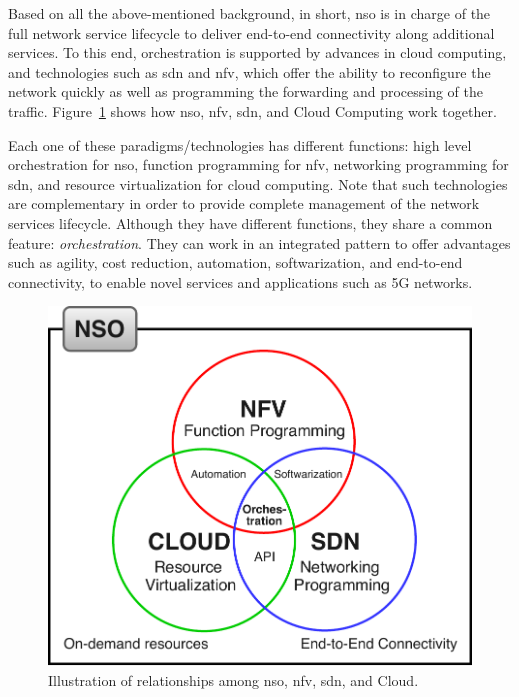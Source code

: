 Based on all the above-mentioned background, in short, \gls{nso} is in charge of the full network service lifecycle to deliver end-to-end connectivity along additional services. To this end, orchestration is supported by advances in cloud computing, and technologies such as \gls{sdn} and \gls{nfv}, which offer the ability to reconfigure the network quickly as well as programming the forwarding and processing of the traffic. Figure~\ref{nso_rel} shows how \gls{nso}, \gls{nfv}, \gls{sdn}, and Cloud Computing work together. %

Each one of these paradigms/technologies has different functions: high level orchestration for \gls{nso}, function programming for \gls{nfv}, networking programming for \gls{sdn},  and resource virtualization for cloud computing. Note that such technologies are complementary in order to provide complete management of the network services lifecycle. Although they have different functions, they share a common feature: \textit{orchestration}. They can work in an integrated pattern to offer advantages such as agility, cost reduction, automation, softwarization, and end-to-end connectivity, to enable novel services and applications such as 5G networks.

\begin{figure}[t]
  \centering
  \includegraphics[scale=.45]{Figures/02_Background/nso_rel.pdf}
    \caption{Illustration of relationships among \gls{nso}, \gls{nfv}, \gls{sdn}, and Cloud.}
    \label{nso_rel}
\end{figure}

